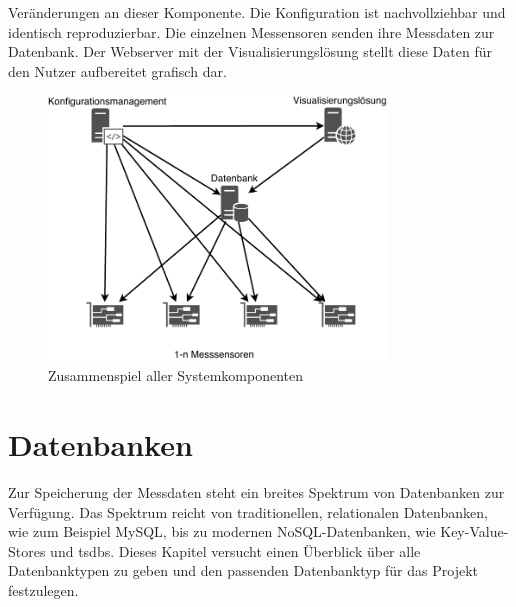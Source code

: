 \documentclass[titlepage]{report}
\begin{document}
Veränderungen an dieser Komponente. Die Konfiguration ist
nachvollziehbar und identisch reproduzierbar.
Die einzelnen Messensoren senden ihre Messdaten zur Datenbank. Der
Webserver mit der Visualisierungslösung stellt diese Daten für den Nutzer aufbereitet
 grafisch dar.
\begin{figure}[H]
    \centering
    \includegraphics[width=0.8\textwidth]{figures/network.pdf}
    \caption{Zusammenspiel aller Systemkomponenten}\label{fig:network}
\end{figure}
\section*{Datenbanken}
Zur Speicherung der Messdaten steht ein breites Spektrum von Datenbanken
zur Verfügung. Das Spektrum reicht von traditionellen, relationalen
Datenbanken, wie zum Beispiel MySQL, bis zu modernen
NoSQL\hyp{}Datenbanken, wie Key\hyp{}Value\hyp{}Stores und \glspl{tsdb}.
Dieses Kapitel versucht einen Überblick über alle Datenbanktypen zu
geben und den passenden Datenbanktyp für das Projekt festzulegen.
\end{document}
